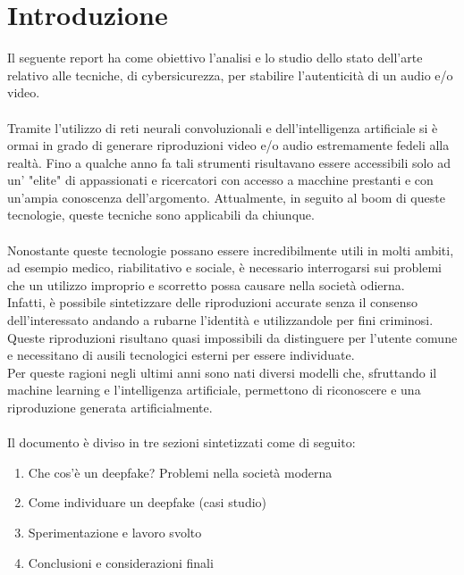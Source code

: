 \documentclass[12pt, a4paper]{article}
\begin{document}


\newpage

\section{Introduzione}
Il seguente report ha come obiettivo l'analisi e lo studio dello stato dell'arte relativo alle tecniche, di cybersicurezza, per stabilire l'autenticità di un audio e/o video. \\\\
Tramite l'utilizzo di reti neurali convoluzionali e dell'intelligenza artificiale si è ormai in grado di generare riproduzioni video e/o audio estremamente fedeli alla realtà. Fino a qualche anno fa tali strumenti risultavano essere accessibili solo ad un' "elite" di appassionati e ricercatori con accesso a macchine prestanti e con un'ampia conoscenza dell'argomento. Attualmente, in seguito al boom di queste tecnologie, queste tecniche sono applicabili da chiunque.
\\\\
Nonostante queste tecnologie possano essere incredibilmente utili in molti ambiti, ad esempio medico, riabilitativo e sociale, è necessario interrogarsi sui problemi che un utilizzo improprio e scorretto possa causare nella società odierna.\\
Infatti, è possibile sintetizzare delle riproduzioni accurate senza il consenso dell'interessato andando a rubarne l'identità e utilizzandole per fini criminosi.
Queste riproduzioni risultano quasi impossibili da distinguere per l'utente comune e necessitano di ausili tecnologici esterni per essere individuate. \\
Per queste ragioni negli ultimi anni sono nati diversi modelli che, sfruttando il machine learning e l'intelligenza artificiale, permettono di riconoscere e una riproduzione generata artificialmente. 
\\\\
Il documento è diviso in tre sezioni sintetizzati come di seguito: 
\begin{enumerate}
    \item Che cos'è un deepfake? Problemi nella società moderna
    \item Come individuare un deepfake (casi studio)
    \item Sperimentazione e lavoro svolto
    \item Conclusioni e considerazioni finali
\end{enumerate}
\end{document}
